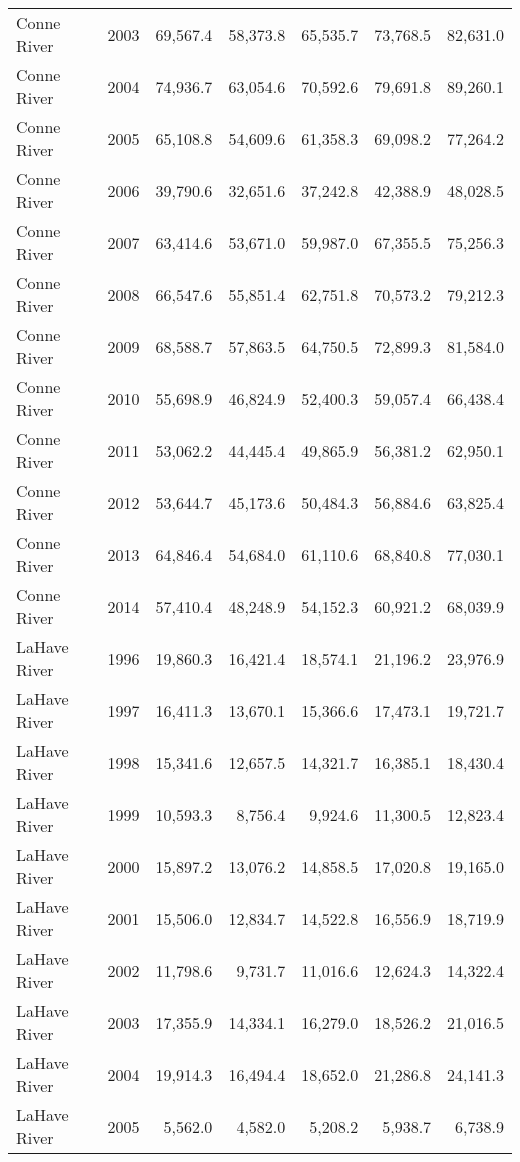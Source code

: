 \begin{longtable}{llrrrrr}
  Conne River & 2003 & 69,567.4 & 58,373.8 & 65,535.7 & 73,768.5 & 82,631.0 \\ 
  Conne River & 2004 & 74,936.7 & 63,054.6 & 70,592.6 & 79,691.8 & 89,260.1 \\ 
  Conne River & 2005 & 65,108.8 & 54,609.6 & 61,358.3 & 69,098.2 & 77,264.2 \\ 
  Conne River & 2006 & 39,790.6 & 32,651.6 & 37,242.8 & 42,388.9 & 48,028.5 \\ 
  Conne River & 2007 & 63,414.6 & 53,671.0 & 59,987.0 & 67,355.5 & 75,256.3 \\ 
  Conne River & 2008 & 66,547.6 & 55,851.4 & 62,751.8 & 70,573.2 & 79,212.3 \\ 
  Conne River & 2009 & 68,588.7 & 57,863.5 & 64,750.5 & 72,899.3 & 81,584.0 \\ 
  Conne River & 2010 & 55,698.9 & 46,824.9 & 52,400.3 & 59,057.4 & 66,438.4 \\ 
  Conne River & 2011 & 53,062.2 & 44,445.4 & 49,865.9 & 56,381.2 & 62,950.1 \\ 
  Conne River & 2012 & 53,644.7 & 45,173.6 & 50,484.3 & 56,884.6 & 63,825.4 \\ 
  Conne River & 2013 & 64,846.4 & 54,684.0 & 61,110.6 & 68,840.8 & 77,030.1 \\ 
  Conne River & 2014 & 57,410.4 & 48,248.9 & 54,152.3 & 60,921.2 & 68,039.9 \\ 
  LaHave River & 1996 & 19,860.3 & 16,421.4 & 18,574.1 & 21,196.2 & 23,976.9 \\ 
  LaHave River & 1997 & 16,411.3 & 13,670.1 & 15,366.6 & 17,473.1 & 19,721.7 \\ 
  LaHave River & 1998 & 15,341.6 & 12,657.5 & 14,321.7 & 16,385.1 & 18,430.4 \\ 
  LaHave River & 1999 & 10,593.3 & 8,756.4 & 9,924.6 & 11,300.5 & 12,823.4 \\ 
  LaHave River & 2000 & 15,897.2 & 13,076.2 & 14,858.5 & 17,020.8 & 19,165.0 \\ 
  LaHave River & 2001 & 15,506.0 & 12,834.7 & 14,522.8 & 16,556.9 & 18,719.9 \\ 
  LaHave River & 2002 & 11,798.6 & 9,731.7 & 11,016.6 & 12,624.3 & 14,322.4 \\ 
  LaHave River & 2003 & 17,355.9 & 14,334.1 & 16,279.0 & 18,526.2 & 21,016.5 \\ 
  LaHave River & 2004 & 19,914.3 & 16,494.4 & 18,652.0 & 21,286.8 & 24,141.3 \\ 
  LaHave River & 2005 & 5,562.0 & 4,582.0 & 5,208.2 & 5,938.7 & 6,738.9 \\ 

\end{longtable}
